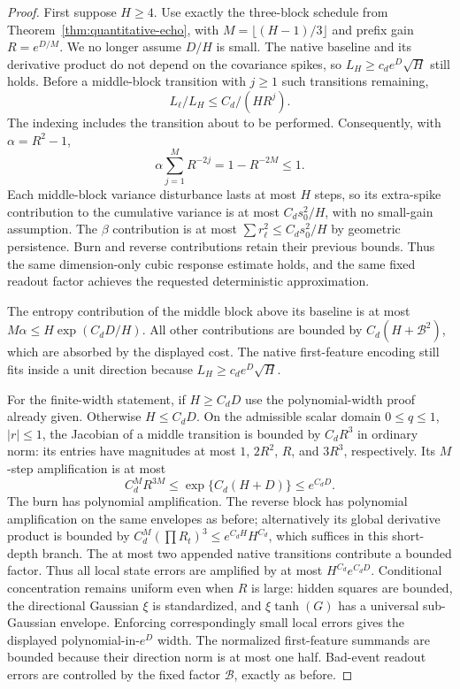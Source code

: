 \begin{proof}
First suppose $H\ge4$. Use exactly the three-block schedule from Theorem~\ref{thm:quantitative-echo}, with $M=\lfloor(H-1)/3\rfloor$ and prefix gain $R=e^{D/M}$. We no longer assume $D/H$ is small. The native baseline and its derivative product do not depend on the covariance spikes, so $L_H\ge c_de^D\sqrt H$ still holds. Before a middle-block transition with $j\ge1$ such transitions remaining,
\[
 L_\ell/L_H\le C_d/(H R^j).
\]
The indexing includes the transition about to be performed. Consequently, with $\alpha=R^2-1$,
\[
 \alpha\sum_{j=1}^M R^{-2j}=1-R^{-2M}\le1.
\]
Each middle-block variance disturbance lasts at most $H$ steps, so its extra-spike contribution to the cumulative variance is at most $C_ds_0^2/H$, with no small-gain assumption. The $\beta$ contribution is at most $\sum r_\ell^2\le C_ds_0^2/H$ by geometric persistence. Burn and reverse contributions retain their previous bounds. Thus the same dimension-only cubic response estimate holds, and the same fixed readout factor achieves the requested deterministic approximation.

The entropy contribution of the middle block above its baseline is at most $M\alpha\le H\exp(C_dD/H)$. All other contributions are bounded by $C_d(H+\mathcal B^2)$, which are absorbed by the displayed cost. The native first-feature encoding still fits inside a unit direction because $L_H\ge c_de^D\sqrt H$.

For the finite-width statement, if $H\ge C_dD$ use the polynomial-width proof already given. Otherwise $H\le C_dD$. On the admissible scalar domain $0\le q\le1$, $|r|\le1$, the Jacobian of a middle transition is bounded by $C_dR^3$ in ordinary norm: its entries have magnitudes at most $1$, $2R^2$, $R$, and $3R^3$, respectively. Its $M$-step amplification is at most
\[
 C_d^M R^{3M}\le\exp\{C_d(H+D)\}\le e^{C_dD}.
\]
The burn has polynomial amplification. The reverse block has polynomial amplification on the same envelopes as before; alternatively its global derivative product is bounded by $C_d^M(\prod R_t)^3\le e^{C_dH}H^{C_d}$, which suffices in this short-depth branch. The at most two appended native transitions contribute a bounded factor. Thus all local state errors are amplified by at most $H^{C_d}e^{C_dD}$. Conditional concentration remains uniform even when $R$ is large: hidden squares are bounded, the directional Gaussian $\xi$ is standardized, and $\xi\tanh(G)$ has a universal sub-Gaussian envelope. Enforcing correspondingly small local errors gives the displayed polynomial-in-$e^D$ width. The normalized first-feature summands are bounded because their direction norm is at most one half. Bad-event readout errors are controlled by the fixed factor $\mathcal B$, exactly as before.


\end{proof}
